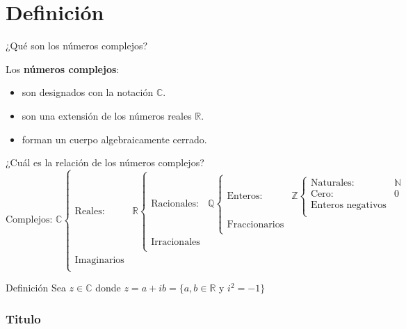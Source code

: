 
\section{Definición}

\begin{frame}[c]{¿Qué son los números complejos?}

  Los \textbf{números complejos}:

  \begin{itemize}
    \item son designados con la notación $\mathbb{C}$.
    \pausa
    \item son una extensión de los números reales $\mathbb{R}$.
    \pausa
    \item forman un cuerpo algebraicamente cerrado.
  \end{itemize}
\end{frame}

\begin{frame}[c]{¿Cuál es la relación de los números complejos?}
  \[
    \text{Complejos: }\mathbb{C} \begin{cases}
      \text{Reales:} & \mathbb{R} \begin{cases}
        \text{Racionales:} & \mathbb{Q} \begin{cases}
          \text{Enteros:} & \mathbb{Z} \begin{cases}
            \text{Naturales:} & \mathbb{N} \\
            \text{Cero:} & 0 \\
            \text{Enteros negativos} & \\
            \end{cases} \\
          \text{Fraccionarios} &  \\
          \end{cases} \\
        \text{Irracionales} &  \\
        \end{cases} \\
      \text{Imaginarios} & \\
    \end{cases}
  \]
\end{frame}

\begin{frame}[c]{Definición}
  Sea $z \in \mathbb{C}$ donde $z = a + ib = \{ a,b \in \mathbb{R}$ y $ i^2
  = -1 \}$
\end{frame}

\begin{frame}[fragile]
  \frametitle{Titulo}

  \vspace{\baselineskip}
  \begin{lstlisting}[language=Python]
  \end{lstlisting}
\end{frame}
